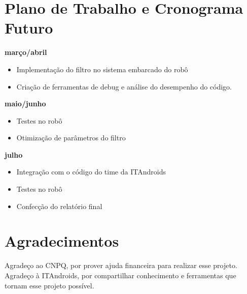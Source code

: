 \documentclass[paper=a4, fontsize=11pt]{scrartcl}
\begin{document}
\section{Plano de Trabalho e Cronograma Futuro}
\textbf{março/abril}
\begin{itemize}
    \item Implementação do filtro no sistema embarcado do robô
    \item Criação de ferramentas de debug e análise do desempenho do código.
\end{itemize}
\textbf{maio/junho}
\begin{itemize}
    \item Testes no robô
    \item Otimização de parâmetros do filtro
\end{itemize}
\textbf{julho}
\begin{itemize}
    \item Integração com o código do time da ITAndroids
    \item Testes no robô
    \item Confecção do relatório final
\end{itemize}


\section{Agradecimentos}
Agradeço ao CNPQ, por prover ajuda financeira para realizar esse projeto. Agradeço à ITAndroids, por compartilhar conhecimento e ferramentas que tornam esse projeto possível.







%
%
%
\end{document}
